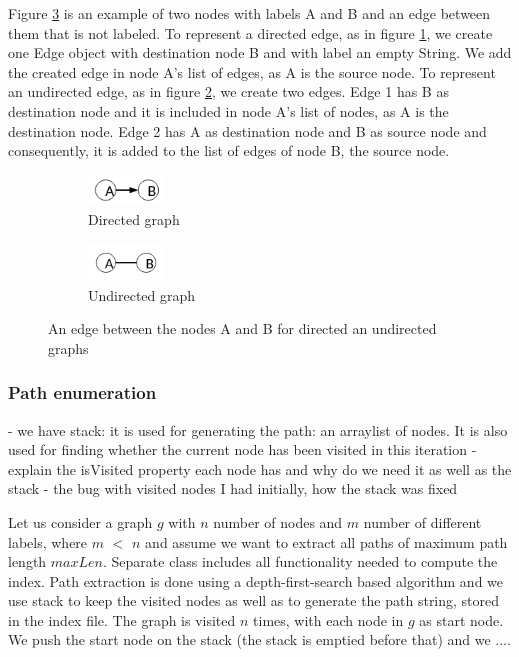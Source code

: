 \documentclass{l4proj}
\theoremstyle{definition}
\begin{document}
    Figure \ref{A-B} is an example of two nodes with labels A and B and an edge between them that is not labeled. To represent a directed edge, as in figure \ref{directed}, we create one Edge object with destination node B and with label an empty String. We add the created edge in node A's list of edges, as A is the source node. To represent an undirected edge, as in figure \ref{undirected}, we create two edges. Edge 1 has B as destination node and it is included in node A's list of nodes, as A is the destination node. Edge 2 has A as destination node and B as source node and consequently, it is added to the list of edges of node B, the source node.
     
\begin{figure}[h]
\centering
\begin{subfigure}{.5\textwidth}
  \centering
  \includegraphics[height=0.8cm,width=2cm]{graphs_paths/A-Bdirected.png}
  \caption{Directed graph}
  \label{directed}
\end{subfigure}%
\begin{subfigure}{.5\textwidth}
  \centering
  \includegraphics[height=1cm,width=2cm]{graphs_paths/A-B.png}
  \caption{Undirected graph}
  \label{undirected}
\end{subfigure}
\caption{An edge between the nodes A and B for directed an undirected graphs}
\label{A-B}
\end{figure}
         
\subsubsection{Path enumeration}

- we have stack: it is used for generating the path: an arraylist of nodes. It is also used for finding whether the current node has been visited in this iteration
- explain the isVisited property each node has and why do we need it as well as the stack
- the bug with visited nodes I had initially, how the stack was fixed

   Let us consider a graph $g$ with $n$ number of nodes and $m$ number of different labels, where $m$ $<$ $n$ and assume we want to extract all paths of maximum path length $maxLen$.
   Separate class includes all functionality needed to compute the index. Path extraction is done using a depth-first-search based algorithm and we use stack to keep the visited nodes as well as to generate the path string, stored in the index file.  
   The graph is visited $n$ times, with each node in $g$ as start node. We push the start node on the stack (the stack is emptied before that) and we ....
\end{document}
